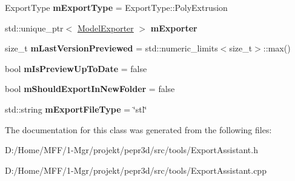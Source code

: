 \begin{DoxyCompactItemize}
\mbox{\label{classpepr3d_1_1_export_assistant_aae991da0c7b884c0004f46b763a7d941}} 
Export\+Type {\bfseries m\+Export\+Type} = Export\+Type\+::\+Poly\+Extrusion
\item 
\mbox{\label{classpepr3d_1_1_export_assistant_aaa3c65341b50ece8cf27c1a9aaf82160}} 
std\+::unique\+\_\+ptr$<$ \mbox{\hyperlink{classpepr3d_1_1_model_exporter}{Model\+Exporter}} $>$ {\bfseries m\+Exporter}
\item 
\mbox{\label{classpepr3d_1_1_export_assistant_a8d352fcdc0c39bd6ad0234462dde11c3}} 
size\+\_\+t {\bfseries m\+Last\+Version\+Previewed} = std\+::numeric\+\_\+limits$<$size\+\_\+t$>$\+::max()
\item 
\mbox{\label{classpepr3d_1_1_export_assistant_aabb310072c4389c99b52410c095f76be}} 
bool {\bfseries m\+Is\+Preview\+Up\+To\+Date} = false
\item 
\mbox{\label{classpepr3d_1_1_export_assistant_a50eccc83e66faf6009e28c1ab4c65524}} 
bool {\bfseries m\+Should\+Export\+In\+New\+Folder} = false
\item 
\mbox{\label{classpepr3d_1_1_export_assistant_a5eaf6eec0212e24225c371cc462160d6}} 
std\+::string {\bfseries m\+Export\+File\+Type} = \char`\"{}stl\char`\"{}
\end{DoxyCompactItemize}


The documentation for this class was generated from the following files\+:\begin{DoxyCompactItemize}
\item 
D\+:/\+Home/\+M\+F\+F/1-\/\+Mgr/projekt/pepr3d/src/tools/Export\+Assistant.\+h\item 
D\+:/\+Home/\+M\+F\+F/1-\/\+Mgr/projekt/pepr3d/src/tools/Export\+Assistant.\+cpp\end{DoxyCompactItemize}
